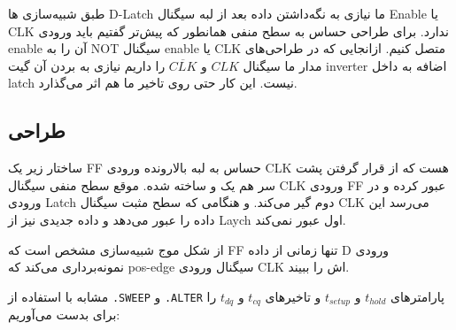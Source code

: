 
طبق شبیه‌سازی ها D-Latch ما نیازی به نگه‌داشتن داده بعد از لبه سیگنال Enable یا CLK ندارد.
برای طراحی  حساس به سطح منفی همانطور که پیش‌تر گفتیم باید ورودی enable آن را به NOT سیگنال enable یا CLK متصل کنیم. ازانجایی که در طراحی‌های مدار ما سیگنال $CLK$ و $\overline{CLK}$ را داریم نیازی به بردن آن گیت inverter اضافه به داخل latch نیست.
این کار حتی روی تاخیر ما هم اثر می‌گذارد.\\



\subsection{طراحی }
ساختار زیر یک FF حساس به لبه بالارونده ورودی CLK هست که از قرار گرفتن پشت سر هم یک  و  ساخته شده.
موقع سطح منفی سیگنال CLK ورودی FF عبور کرده و در ورودی Latch دوم گیر می‌کند. و هنگامی که سطح مثبت سیگنال CLK می‌رسد این داده را عبور می‌دهد و داده جدیدی نیز از Laych اول عبور نمی‌کند.



از شکل موج شبیه‌سازی مشخص است که FF تنها زمانی از داده D ورودی نمونه‌برداری می‌کند که pos-edge سیگنال ورودی CLK اش را ببیند.

\newpage

مشابه  با استفاده از \texttt{.SWEEP} و \texttt{.ALTER} پارامتر‌های $t_{hold}$ و $t_{setup}$ و تاخیر‌های $t_{cq}$ و $t_{dq}$ را برای  بدست می‌آوریم:

